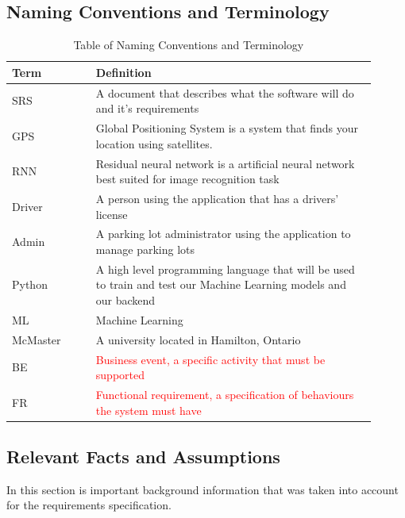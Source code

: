 \documentclass[12pt,letterpaper]{article}
\newcommand{\newterm}[1]{\label{Term:#1} \MakeUppercase #1}
\begin{document}
\newpage
\subsection{Naming Conventions and Terminology}
\label{sub:Naming Conventions and Terminology}
\begin{table}[h!]
    \centering
    \caption{Table of Naming Conventions and Terminology}
    \label{tab:Definitions}
    \begin{tabular}{p{0.21\linewidth}  p{0.70\linewidth}}
    \toprule
    \textbf{Term} & \textbf{Definition}\\
    \midrule
    \newterm{SRS} & A document that describes what the software will do and it's
    requirements\\
    \hline
    \newterm{GPS} & Global Positioning System is a system that finds your
    location using satellites.\\
    \hline
    \newterm{RNN} & Residual neural network is a artificial neural network best
    suited for image recognition task \\
    \hline
    \newterm{Driver} & A person using the application that has a drivers'
    license\\
    \hline
    \newterm{Admin} & A parking lot administrator using the application to
    manage parking lots\\
    \hline
    \newterm{Python} & A high level programming language that will be used to
    train and test our Machine Learning models and our backend\\
    \hline
    \newterm{ML} & Machine Learning\\
    \hline
    \newterm{McMaster} & A university located in Hamilton, Ontario\\
    \hline
    \newterm{BE} & \textcolor{red}{Business event, a specific activity that must
    be supported}\\
    \hline
    \newterm{FR} & \textcolor{red}{Functional requirement, a specification of
    behaviours the system must have}\\
    \bottomrule
    \end{tabular}
\end{table}

\subsection{Relevant Facts and Assumptions}
In this section is important background information that was taken into account
for the requirements specification.
\end{document}
